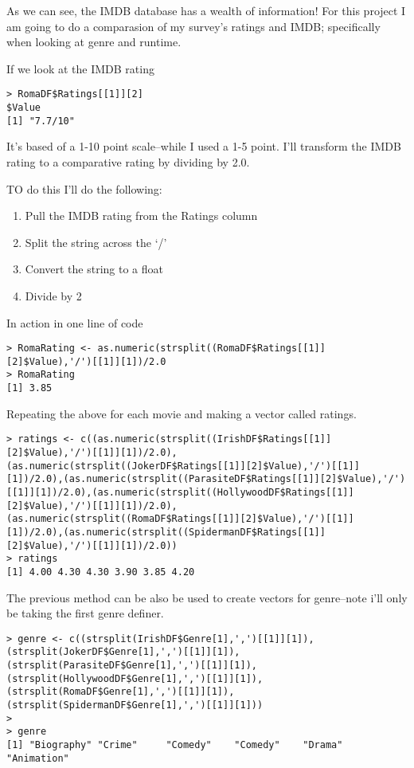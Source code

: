 \documentclass[
]{article}
\providecommand{\tightlist}{%
  \setlength{\itemsep}{0pt}\setlength{\parskip}{0pt}}
\begin{document}
As we can see, the IMDB database has a wealth of information! For this
project I am going to do a comparasion of my survey's ratings and IMDB;
specifically when looking at genre and runtime.

If we look at the IMDB rating

\begin{verbatim}
> RomaDF$Ratings[[1]][2]
$Value
[1] "7.7/10"
\end{verbatim}

It's based of a 1-10 point scale--while I used a 1-5 point. I'll
transform the IMDB rating to a comparative rating by dividing by 2.0.

TO do this I'll do the following:

\begin{enumerate}
\def\labelenumi{\arabic{enumi}.}
\tightlist
\item
  Pull the IMDB rating from the Ratings column 
\item
  Split the string across the `/'
\item
  Convert the string to a float
\item
  Divide by 2
\end{enumerate}

In action in one line of code

\begin{verbatim}
> RomaRating <- as.numeric(strsplit((RomaDF$Ratings[[1]][2]$Value),'/')[[1]][1])/2.0
> RomaRating
[1] 3.85
\end{verbatim}

Repeating the above for each movie and making a vector called ratings.

\begin{verbatim}
> ratings <- c((as.numeric(strsplit((IrishDF$Ratings[[1]][2]$Value),'/')[[1]][1])/2.0),(as.numeric(strsplit((JokerDF$Ratings[[1]][2]$Value),'/')[[1]][1])/2.0),(as.numeric(strsplit((ParasiteDF$Ratings[[1]][2]$Value),'/')[[1]][1])/2.0),(as.numeric(strsplit((HollywoodDF$Ratings[[1]][2]$Value),'/')[[1]][1])/2.0),(as.numeric(strsplit((RomaDF$Ratings[[1]][2]$Value),'/')[[1]][1])/2.0),(as.numeric(strsplit((SpidermanDF$Ratings[[1]][2]$Value),'/')[[1]][1])/2.0))
> ratings
[1] 4.00 4.30 4.30 3.90 3.85 4.20
\end{verbatim}

The previous method can be also be used to create vectors for
genre--note i'll only be taking the first genre definer.

\begin{verbatim}
> genre <- c((strsplit(IrishDF$Genre[1],',')[[1]][1]),(strsplit(JokerDF$Genre[1],',')[[1]][1]),(strsplit(ParasiteDF$Genre[1],',')[[1]][1]),(strsplit(HollywoodDF$Genre[1],',')[[1]][1]),(strsplit(RomaDF$Genre[1],',')[[1]][1]),(strsplit(SpidermanDF$Genre[1],',')[[1]][1]))
> 
> genre
[1] "Biography" "Crime"     "Comedy"    "Comedy"    "Drama"     "Animation"
\end{verbatim}
\end{document}
